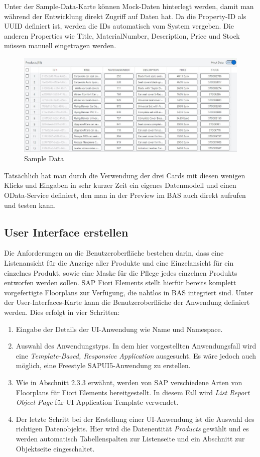 Unter der Sample-Data-Karte können Mock-Daten hinterlegt werden, damit man während der Entwicklung direkt Zugriff auf Daten hat. Da die Property-ID als UUID definiert ist, werden die IDs automatisch vom System vergeben. Die anderen Properties wie Title, MaterialNumber, Description, Price und Stock müssen manuell eingetragen werden.

\begin{figure}[htbp]
 \centering
 \includegraphics[width=1.0\textwidth]{Bilder/fiori_element/3_6_Sample_Data.JPG}
 \caption{Sample Data}
\end{figure}

Tatsächlich hat man durch die Verwendung der drei Cards mit diesen wenigen Klicks und Eingaben in sehr kurzer Zeit ein eigenes Datenmodell und einen OData-Service definiert, den man in der Preview im BAS auch direkt aufrufen und testen kann.

\subsection{User Interface erstellen }

Die Anforderungen an die Benutzeroberfläche bestehen darin, dass eine Listenansicht für die Anzeige aller Produkte und eine Einzelansicht für ein einzelnes Produkt, sowie eine Maske für die Pflege jedes einzelnen Produkts entworfen werden sollen. SAP Fiori Elements stellt hierfür bereits komplett vorgefertigte Floorplans zur Verfügung, die nahtlos in BAS integriert sind.
Unter der User-Interfaces-Karte kann die Benutzeroberfläche der Anwendung definiert werden. Dies erfolgt in vier Schritten: 

\begin{enumerate}
\item Eingabe der Details der UI-Anwendung wie Name und Namespace.
\item Auswahl des Anwendungstyps. In dem hier vorgestellten Anwendungsfall wird eine \textit{Template-Based, Responsive Application} ausgesucht. Es wäre jedoch auch möglich, eine Freestyle SAPUI5-Anwendung zu erstellen.
\item Wie in Abschnitt 2.3.3 erwähnt, werden von SAP verschiedene Arten von Floorplans für Fiori Elements bereitgestellt. In diesem Fall wird \textit{List Report Object Page} für UI Application Template verwendet.
\item Der letzte Schritt bei der Erstellung einer UI-Anwendung ist die Auswahl des richtigen Datenobjekts. Hier wird die Datenentität \textit{Products} gewählt und es werden automatisch Tabellenspalten zur Listenseite und ein Abschnitt zur Objektseite eingeschaltet. 
\end{enumerate}

